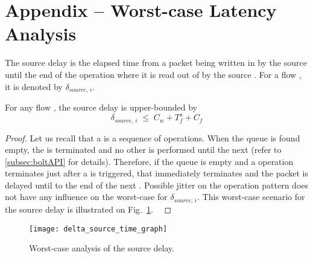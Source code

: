 
\section{Appendix -- Worst-case Latency Analysis}
\label{append:drp_WCanalysis}

\begin{definition}
The source delay is the elapsed time from
a packet being written in \bolt by the source \apsrc
until
the end of the \opflush operation where it is read out of \bolt by the source \cpsrc.
For a flow \flowi, it is denoted by $\delta_{source, \,i}$.
\end{definition}

\begin{lemma}\label{lem:delta_source}
For any flow \flowi, the source delay is upper-bounded by
\begin{equation}
\label{eq:delta_source}
\delta_{source, \,i} \; \leq \; C_w + T_f^s + C_f
\end{equation}
\end{lemma}

\begin{proof}%
Let us recall that a \opflush is a sequence of \opread operations. When the \bolt queue is found empty, the \opflush is terminated and no other \opread is performed until the next \opflush (refer to \ref{subsec:boltAPI} for details).
Therefore, if the \bolt queue is empty and a \opwrite operation terminates just after a \opflush is triggered, that \opflush immediately terminates and the packet is delayed until to the end of the next \opflush.
Possible jitter on the \opwrite operation pattern does not have any influence on the worst-case for $\delta_{source, \,i}$.
This worst-case scenario for the source delay is illustrated on Fig.~\ref{fig:delta_source_time_graph}. \
\end{proof}

\begin{figure}[h!]
\centering
\texttt{[image: delta\_source\_time\_graph]}
\caption{Worst-case analysis of the source delay.
}
\label{fig:delta_source_time_graph}
\end{figure}


